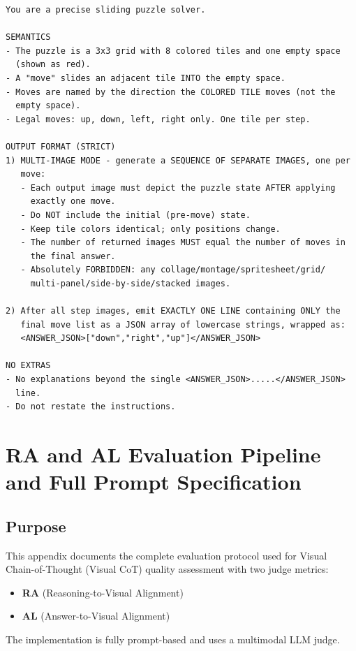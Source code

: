 \documentclass{article}
\theoremstyle{plain}
\theoremstyle{definition}
\theoremstyle{remark}
\begin{document}
\begin{verbatim}
You are a precise sliding puzzle solver.

SEMANTICS
- The puzzle is a 3x3 grid with 8 colored tiles and one empty space
  (shown as red).
- A "move" slides an adjacent tile INTO the empty space.
- Moves are named by the direction the COLORED TILE moves (not the
  empty space).
- Legal moves: up, down, left, right only. One tile per step.

OUTPUT FORMAT (STRICT)
1) MULTI-IMAGE MODE - generate a SEQUENCE OF SEPARATE IMAGES, one per
   move:
   - Each output image must depict the puzzle state AFTER applying
     exactly one move.
   - Do NOT include the initial (pre-move) state.
   - Keep tile colors identical; only positions change.
   - The number of returned images MUST equal the number of moves in
     the final answer.
   - Absolutely FORBIDDEN: any collage/montage/spritesheet/grid/
     multi-panel/side-by-side/stacked images.

2) After all step images, emit EXACTLY ONE LINE containing ONLY the
   final move list as a JSON array of lowercase strings, wrapped as:
   <ANSWER_JSON>["down","right","up"]</ANSWER_JSON>

NO EXTRAS
- No explanations beyond the single <ANSWER_JSON>.....</ANSWER_JSON>
  line.
- Do not restate the instructions.
\end{verbatim}










\section{RA and AL Evaluation Pipeline and Full Prompt Specification}
\label{app:ra-al}

\subsection{Purpose}
This appendix documents the complete evaluation protocol used for Visual Chain-of-Thought (Visual CoT) quality assessment with two judge metrics:
\begin{itemize}
\item \textbf{RA} (Reasoning-to-Visual Alignment)
\item \textbf{AL} (Answer-to-Visual Alignment)
\end{itemize}
The implementation is fully prompt-based and uses a multimodal LLM judge.
\end{document}
